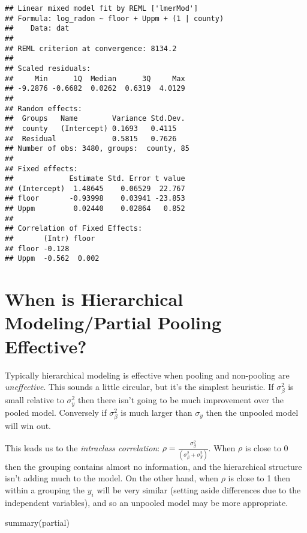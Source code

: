 \documentclass[
]{article}
\newenvironment{Shaded}{\begin{snugshade}}{\end{snugshade}}
\newcommand{\FunctionTok}[1]{\textcolor[rgb]{0.00,0.00,0.00}{#1}}
\newcommand{\NormalTok}[1]{#1}
\begin{document}
\begin{verbatim}
## Linear mixed model fit by REML ['lmerMod']
## Formula: log_radon ~ floor + Uppm + (1 | county)
##    Data: dat
## 
## REML criterion at convergence: 8134.2
## 
## Scaled residuals: 
##     Min      1Q  Median      3Q     Max 
## -9.2876 -0.6682  0.0262  0.6319  4.0129 
## 
## Random effects:
##  Groups   Name        Variance Std.Dev.
##  county   (Intercept) 0.1693   0.4115  
##  Residual             0.5815   0.7626  
## Number of obs: 3480, groups:  county, 85
## 
## Fixed effects:
##             Estimate Std. Error t value
## (Intercept)  1.48645    0.06529  22.767
## floor       -0.93998    0.03941 -23.853
## Uppm         0.02440    0.02864   0.852
## 
## Correlation of Fixed Effects:
##       (Intr) floor 
## floor -0.128       
## Uppm  -0.562  0.002
\end{verbatim}

\hypertarget{when-is-hierarchical-modelingpartial-pooling-effective}{%
\section{When is Hierarchical Modeling/Partial Pooling
Effective?}\label{when-is-hierarchical-modelingpartial-pooling-effective}}

Typically hierarchical modeling is effective when pooling and
non-pooling are \emph{uneffective}. This sounds a little circular, but
it's the simplest heuristic. If \(\sigma^2_{\beta}\) is small relative
to \(\sigma^2_y\) then there isn't going to be much improvement over the
pooled model. Conversely if \(\sigma_{\beta}^2\) is much larger than
\(\sigma_y\) then the unpooled model will win out.

This leads us to the \emph{intraclass correlation}:
\(\rho = \frac{\sigma_{\beta}^2}{(\sigma_{\beta}^2 + \sigma_y^2)}\).
When \(\rho\) is close to 0 then the grouping contains almost no
information, and the hierarchical structure isn't adding much to the
model. On the other hand, when \(\rho\) is close to 1 then within a
grouping the \(y_i\) will be very similar (setting aside differences due
to the independent variables), and so an unpooled model may be more
appropriate.

\begin{Shaded}
\begin{Highlighting}[]
\FunctionTok{summary}\NormalTok{(partial)}
\end{Highlighting}
\end{Shaded}
\end{document}
